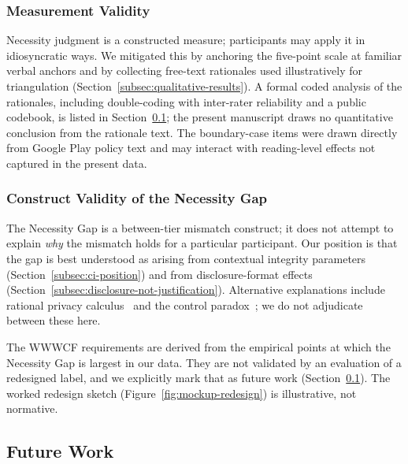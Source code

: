 \documentclass[11pt,a4paper]{article}
\begin{document}
\subsubsection{Measurement Validity}

Necessity judgment is a constructed measure; participants may apply
it in idiosyncratic ways. We mitigated this by anchoring the
five-point scale at familiar verbal anchors and by collecting
free-text rationales used illustratively for triangulation
(Section~\ref{subsec:qualitative-results}). A formal coded analysis of
the rationales, including double-coding with inter-rater reliability
and a public codebook, is listed in Section~\ref{sec:future}; the
present manuscript draws no quantitative conclusion from the rationale
text. The boundary-case items were drawn directly from Google Play
policy text and may interact with reading-level effects not captured
in the present data.

\subsubsection{Construct Validity of the Necessity Gap}

The Necessity Gap is a between-tier mismatch construct; it does not
attempt to explain \emph{why} the mismatch holds for a particular
participant. Our position is that the gap is best understood as
arising from contextual integrity parameters
(Section~\ref{subsec:ci-position}) and from disclosure-format effects
(Section~\ref{subsec:disclosure-not-justification}). Alternative
explanations include rational privacy
calculus~\citep{acquisti:grossklags:2005} and the control
paradox~\citep{brandimarte:etal:2013}; we do not adjudicate between
these here.


The WWWCF requirements are derived from the empirical points at which
the Necessity Gap is largest in our data. They are not validated by
an evaluation of a redesigned label, and we explicitly mark that as
future work (Section~\ref{sec:future}). The worked redesign sketch
(Figure~\ref{fig:mockup-redesign}) is illustrative, not normative.

\subsection{Future Work}
\label{sec:future}
\end{document}

